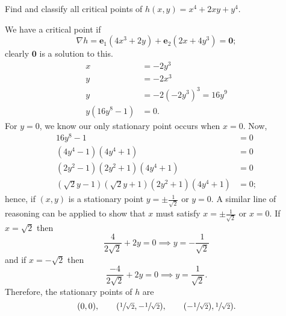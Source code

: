 
\setcounter{question}{53}
\question Find and classify all critical points of $h(x, y) = x^4 + 2xy + y^4$.
\begin{solution}
    We have a critical point if
    \[ \nabla h = \bm e_1 (4x^3 + 2y) + \bm e_2 (2x + 4y^3) = \bm 0; \]
    clearly $\bm 0$ is a solution to this.
    \begin{align*}
        x &= -2y^3 \\
        y &= -2x^3 \\
        y &= -2 (-2y^3)^3 = 16y^9 \\
        y(16y^8 - 1) &= 0.
    \end{align*}
    For $y = 0$, we know our only stationary point occurs when $x = 0$.
    Now,
    \begin{align*}
        16y^8 - 1 &= 0 \\
        (4y^4 - 1)(4y^4 + 1) &= 0 \\
        (2y^2 - 1)(2y^2 + 1) (4y^4 + 1) &= 0 \\
        (\sqrt2y - 1)(\sqrt2y + 1)(2y^2 + 1)(4y^4 + 1) &= 0;
    \end{align*}
    hence, if $(x, y)$ is a stationary point $y = \pm \frac1{\sqrt2}$ or $y = 0$.
    A similar line of reasoning can be applied to show that $x$ must satisfy $x = \pm \frac1{\sqrt2}$ or $x = 0$.
    If $x = \sqrt2$ then
    \[ \frac4{2\sqrt2} + 2y = 0 \implies y = -\frac1{\sqrt2} \]
    and if $x = -\sqrt 2$ then
    \[ \frac{-4}{2\sqrt2} + 2y = 0 \implies y = \frac1{\sqrt 2}. \]
    Therefore, the stationary points of $h$ are
    \[ (0,0), \qquad (\sfrac1{\sqrt 2}, -\sfrac1{\sqrt 2}), \qquad (-\sfrac1{\sqrt 2}), \sfrac1{\sqrt 2}). \]
\end{solution}
